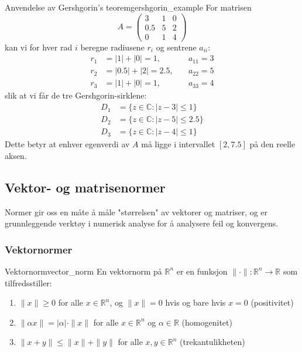\begin{example}{Anvendelse av Gershgorin's teorem}{gershgorin_example}
	For matrisen
	\[
		A = \begin{pmatrix} 3 & 1 & 0 \\ 0.5 & 5 & 2 \\ 0 & 1 & 4 \end{pmatrix}
	\]
	kan vi for hver rad $i$ beregne radiusene $r_i$ og sentrene $a_{ii}$:
	\begin{align*}
		r_1 & = |1| + |0| = 1,     & \quad a_{11} = 3 \\
		r_2 & = |0.5| + |2| = 2.5, & \quad a_{22} = 5 \\
		r_3 & = |1| + |0| = 1,     & \quad a_{33} = 4
	\end{align*}
	slik at vi får de tre Gershgorin-sirklene:
	\begin{align*}
		D_1 & = \{z \in \mathbb{C} : |z - 3| \leq 1\}   \\
		D_2 & = \{z \in \mathbb{C} : |z - 5| \leq 2.5\} \\
		D_3 & = \{z \in \mathbb{C} : |z - 4| \leq 1\}
	\end{align*}
	Dette betyr at enhver egenverdi av $A$ må ligge i intervallet $[2,7.5]$ på den reelle aksen.
\end{example}

\subsection{Vektor- og matrisenormer}

Normer gir oss en måte å måle "størrelsen" av vektorer og matriser, og er grunnleggende verktøy i numerisk analyse for å analysere feil og konvergens.

\subsubsection{Vektornormer}

\begin{definition}{Vektornorm}{vector_norm}
	En vektornorm på $\mathbb{R}^n$ er en funksjon $\|\cdot\| : \mathbb{R}^n \to \mathbb{R}$ som tilfredsstiller:
	\begin{enumerate}
		\item $\|x\| \geq 0$ for alle $x \in \mathbb{R}^n$, og $\|x\| = 0$ hvis og bare hvis $x = 0$ (positivitet)
		\item $\|\alpha x\| = |\alpha| \cdot \|x\|$ for alle $x \in \mathbb{R}^n$ og $\alpha \in \mathbb{R}$ (homogenitet)
		\item $\|x + y\| \leq \|x\| + \|y\|$ for alle $x,y \in \mathbb{R}^n$ (trekantulikheten)
	\end{enumerate}
\end{definition}

